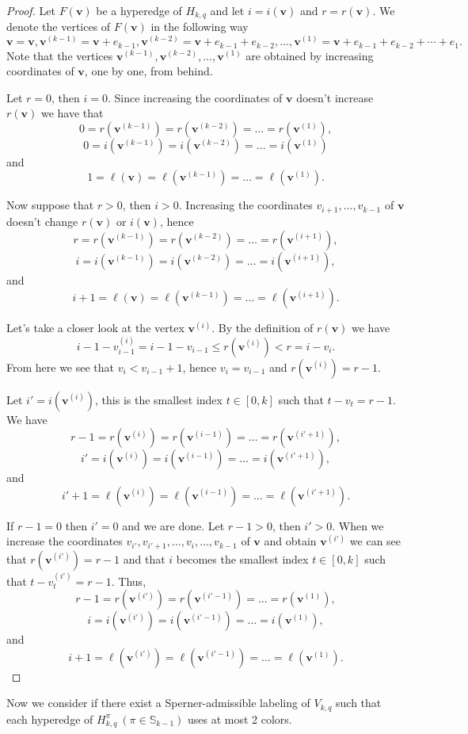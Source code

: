 \documentclass[12pt]{article}
\begin{document}
\begin{proof}
Let $F(\bm{v})$ be a hyperedge of $H_{k,q}$ and let $i=i(\bm{v})$ and $r=r(\bm{v})$. We denote the vertices of $F(\bm{v})$ in the following way
\[\bm{v}=\bm{v}, \bm{v}^{(k-1)}=\bm{v}+e_{k-1},\bm{v}^{(k-2)}=\bm{v}+e_{k-1}+e_{k-2},\ldots,\bm{v}^{(1)}=\bm{v}+e_{k-1}+e_{k-2}+\cdots+e_1.\]
Note that the vertices $\bm{v}^{(k-1)}, \bm{v}^{(k-2)},\ldots,\bm{v}^{(1)}$ are obtained by increasing coordinates of $\bm{v}$, one by one, from behind.

Let $r=0$, then $i=0$.  Since increasing the coordinates of $\bm{v}$ doesn't increase $r(\bm{v})$ we have that
\[0=r(\bm{v}^{(k-1)})=r(\bm{v}^{(k-2)})=\ldots=r(\bm{v}^{(1)}),\]
\[0=i(\bm{v}^{(k-1)})=i(\bm{v}^{(k-2)})=\ldots=i(\bm{v}^{(1)})\]
and
\[1=\ell(\bm{v})=\ell(\bm{v}^{(k-1)})=\ldots=\ell(\bm{v}^{(1)}).\]

Now suppose that $r>0$, then $i>0$. Increasing the coordinates $v_{i+1},\ldots,v_{k-1}$ of $\bm{v}$ doesn't change $r(\bm{v})$ or $i(\bm{v})$, hence
\[r=r(\bm{v}^{(k-1)})=r(\bm{v}^{(k-2)})=\ldots=r(\bm{v}^{(i+1)}),\]
\[i=i(\bm{v}^{(k-1)})=i(\bm{v}^{(k-2)})=\ldots=i(\bm{v}^{(i+1)}),\]
and
\[i+1=\ell(\bm{v})=\ell(\bm{v}^{(k-1)})=\ldots=\ell(\bm{v}^{(i+1)}).\]

Let's take a closer look at the vertex $\bm{v}^{(i)}$. By the definition of $r(\bm{v})$ we have
\[i-1-v^{(i)}_{i-1}=i-1-v_{i-1}\leq r(\bm{v}^{(i)})<r=i-v_i.\]
From here we see that $v_i<v_{i-1}+1$, hence $v_i=v_{i-1}$ and $r(\bm{v}^{(i)})=r-1$. 

Let $i'=i(\bm{v}^{(i)})$, this is the smallest index $t\in[0,k]$ such that $t-v_t=r-1$. We have 
\[r-1=r(\bm{v}^{(i)})=r(\bm{v}^{(i-1)})=\ldots=r(\bm{v}^{(i'+1)}),\]
\[i'=i(\bm{v}^{(i)})=i(\bm{v}^{(i-1)})=\ldots=i(\bm{v}^{(i'+1)}),\]
and  
\[i'+1=\ell(\bm{v}^{(i)})=\ell(\bm{v}^{(i-1)})=\ldots=\ell(\bm{v}^{(i'+1)}).\]

If $r-1=0$ then $i'=0$ and we are done. Let $r-1>0$, then $i'>0$. When we increase the coordinates $v_{i'},v_{i'+1},\ldots,v_{i},\ldots,v_{k-1}$ of $\bm{v}$ and obtain $\bm{v}^{(i')}$ we can see that $r(\bm{v}^{(i')})=r-1$ and that $i$ becomes the smallest index $t\in[0,k]$ such that $t-v^{(i')}_t=r-1$. Thus, 
\[r-1=r(\bm{v}^{(i')})=r(\bm{v}^{(i'-1)})=\ldots=r(\bm{v}^{(1)}),\]
\[i=i(\bm{v}^{(i')})=i(\bm{v}^{(i'-1)})=\ldots=i(\bm{v}^{(1)}),\]
and
\[i+1=\ell(\bm{v}^{(i')})=\ell(\bm{v}^{(i'-1)})=\ldots=\ell(\bm{v}^{(1)}).\]
\end{proof}

Now we consider if there exist a Sperner-admissible labeling of $V_{k,q}$ such that each hyperedge of $H_{k,q}^\pi\ (\pi\in\mathbb S_{k-1})$ uses at most 2 colors.\\
\end{document}
